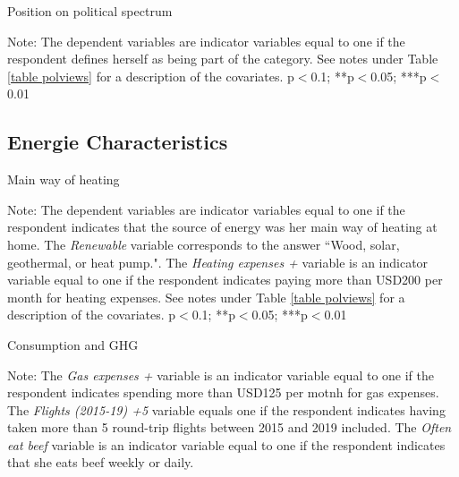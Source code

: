 \documentclass{article}
\begin{document}
\begin{landscape}
	\begin{table}[h!]
	\caption{Position on political spectrum}
	\begin{center}
		\scalebox{0.6}{}
	\end{center}
	{\footnotesize Note: The dependent variables are indicator variables equal to one if the respondent defines herself as being part of the category. See notes under Table \ref{table polviews} for a description of the covariates.
	\newline *p$<$0.1; **p$<$0.05; ***p$<$0.01}
\end{table}	
\end{landscape}



\clearpage
\subsection{Energie Characteristics}



\begin{table}[h!]
	\caption{Main way of heating} \label{table heating}
	\begin{center}
		\scalebox{0.7}{}
	\end{center}
	{\footnotesize Note: The dependent variables are indicator variables equal to one if the respondent indicates that the source of energy was her main way of heating at home. The \textit{Renewable} variable corresponds to the answer ``Wood, solar, geothermal, or heat pump.". The \textit{Heating expenses +} variable is an indicator variable equal to one if the respondent indicates paying more than USD200 per month for heating expenses.
	See notes under Table \ref{table polviews} for a description of the covariates.
	\newline  *p$<$0.1; **p$<$0.05; ***p$<$0.01}
\end{table}	

\begin{table}[h!]
	\caption{Consumption and GHG}
	\begin{center}
		\scalebox{0.7}{}
	\end{center}
	{\footnotesize Note: The \textit{Gas expenses +} variable is an indicator variable equal to one if the respondent indicates spending more than USD125 per motnh for gas expenses. The \textit{Flights (2015-19) +5} variable equals one if the respondent indicates having taken more than 5 round-trip flights between 2015 and 2019 included. The \textit{Often eat beef} variable is an indicator variable equal to one if the respondent indicates that she eats beef weekly or daily.}
\end{table}	
\end{document}
